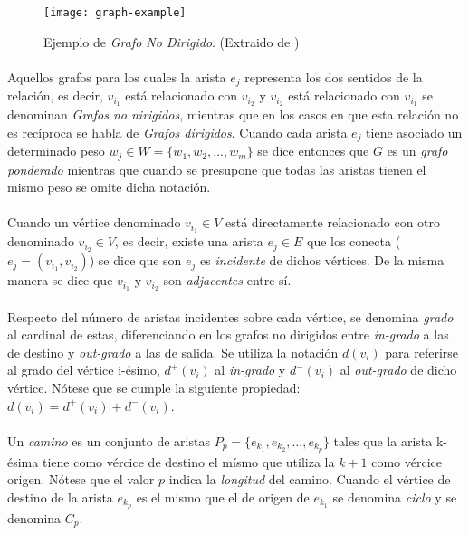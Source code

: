 \documentclass{subfiles}
\begin{document}
      \begin{figure}
        \centering
        \texttt{[image: graph-example]}
        \caption{Ejemplo de \emph{Grafo No Dirigido}. (Extraido de \cite{wiki:Graph_(discrete_mathematics)})}
        \label{img:graph_example}
      \end{figure}

      \paragraph{}
      Aquellos grafos para los cuales la arista $e_j$ representa los dos sentidos de la relación, es decir, $v_{i_1}$ está relacionado con $v_{i_2}$ y $v_{i_2}$ está relacionado con $v_{i_1}$ se denominan \emph{Grafos no nirigidos}, mientras que en los casos en que esta relación no es recíproca se habla de \emph{Grafos dirigidos}. Cuando cada arista $e_j$ tiene asociado un determinado peso $w_j \in W =  \{ w_1, w_2, ..., w_m\}$ se dice entonces que $G$ es un \emph{grafo ponderado} mientras que cuando se presupone que todas las aristas tienen el mismo peso se omite dicha notación.

      \paragraph{}
      Cuando un vértice denominado $v_{i_1} \in V$ está directamente relacionado con otro denominado $v_{i_2} \in V$, es decir, existe una arista $e_j \in E$ que los conecta ($e_j = (v_{i_1}, v_{i_2})$) se dice que son $e_j$ es \emph{incidente} de dichos vértices. De la misma manera se dice que $v_{i_1}$ y $v_{i_2}$ son \emph{adjacentes} entre sí.

      \paragraph{}
      Respecto del número de aristas incidentes sobre cada vértice, se denomina \emph{grado} al cardinal de estas, diferenciando en los grafos no dirigidos entre \emph{in-grado} a las de destino y \emph{out-grado} a las de salida. Se utiliza la notación $d(v_i)$ para referirse al grado del vértice i-ésimo, $d^+(v_i)$ al \emph{in-grado} y $d^-(v_i)$ al \emph{out-grado} de dicho vértice. Nótese que se cumple la siguiente propiedad: $d(v_i) = d^+(v_i) + d^-(v_i)$.


      \paragraph{}
      Un \emph{camino} es un conjunto de aristas $P_p = \{ e_{k_1}, e_{k_2}, ..., e_{k_p}\}$ tales que la arista k-ésima tiene como vércice de destino el mísmo que utiliza la $k+1$ como vércice origen. Nótese que el valor $p$ indica la \emph{longitud} del camino. Cuando el vértice de destino de la arista $e_{k_p}$ es el mismo que el de origen de $e_{k_1}$ se denomina \emph{ciclo} y se denomina $C_p$.
\end{document}
